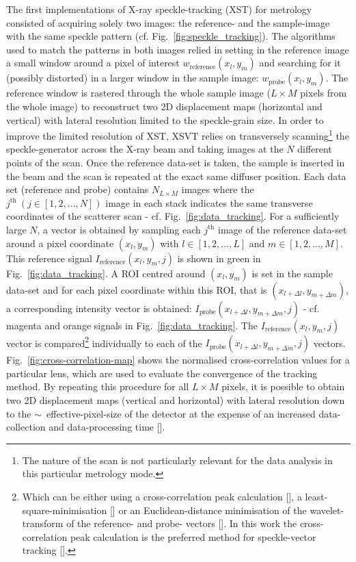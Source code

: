 \begin{refsection}
The first implementations of X-ray speckle-tracking (XST) for metrology consisted of acquiring solely two images: the reference- and the sample-image with the same speckle pattern (cf. Fig.~\ref{fig:speckle_tracking}). The algorithms used to match the patterns in both images relied in setting in the reference image a small window around a pixel of interest $w_\text{reference}(x_l,y_m)$ and searching for it (possibly distorted) in a larger window in the sample image: $w_\text{probe}(x_l,y_m)$. The reference window is rastered through the whole sample image ($L\times M$ pixels from the whole image) to reconstruct two 2D displacement maps (horizontal and vertical) with lateral resolution limited to the speckle-grain size. In order to improve the limited resolution of XST, XSVT relies on transversely scanning\footnote{The nature of the scan is not particularly relevant for the data analysis in this particular metrology mode.} the speckle-generator across the X-ray beam and taking images at the $N$ different points of the scan. Once the reference data-set is taken, the sample is inserted in the beam and the scan is repeated at the exact same diffuser position. Each data set (reference and probe) contains $N_{L\times M}$ images where the $j^\text{th}~(j\in[1,2,...,N])$ image in each stack indicates the same transverse coordinates of the scatterer scan - cf. Fig.~\ref{fig:data_tracking}. For a sufficiently large $N$, a vector is obtained by sampling each $j^\text{th}$ image of the reference data-set around a pixel coordinate $(x_l,y_m)$ with $l\in[1,2,...,L]$ and $m\in[1,2,...,M]$. This reference signal $I_{\text{reference}}(x_l,y_m,j)$ is shown in green in Fig.~\ref{fig:data_tracking}. A ROI centred around $(x_l,y_m)$ is set in the sample data-set and for each pixel coordinate within this ROI, that is $(x_{l+\Delta l},y_{m+\Delta m})$, a corresponding intensity vector is obtained: $I_{\text{probe}}(x_{l+\Delta l},y_{m+\Delta m},j)$ - cf. magenta and orange signals in Fig.~\ref{fig:data_tracking}. The $I_{\text{reference}}(x_l,y_m,j)$ vector is compared\footnote{Which can be either using a cross-correlation peak calculation [\cite{Berujon2012, Morgan2012}], a least-square-minimisation [\cite{Zanette2014, Zdora2017}] or an Euclidean-distance minimisation of the wavelet-transform of the reference- and probe- vectors [\cite{Qiao2020b}].  In this work the cross-correlation peak calculation is the preferred method for speckle-vector tracking [\cite{Berujon2012, Morgan2012}].} individually to each of the $I_{\text{probe}}(x_{l+\Delta l},y_{m+\Delta m},j)$ vectors. Fig.~\ref{fig:cross-correlation-map} shows the normalised cross-correlation values for a particular lens, which are used to evaluate the convergence of the tracking method. By repeating this procedure for all $L\times M$ pixels, it is possible to obtain two 2D displacement maps (vertical and horizontal) with lateral resolution down to the $\sim$~effective-pixel-size of the detector at the expense of an increased data-collection and data-processing time [\cite{Berujon2016,Berujon2020}].


\end{refsection}
